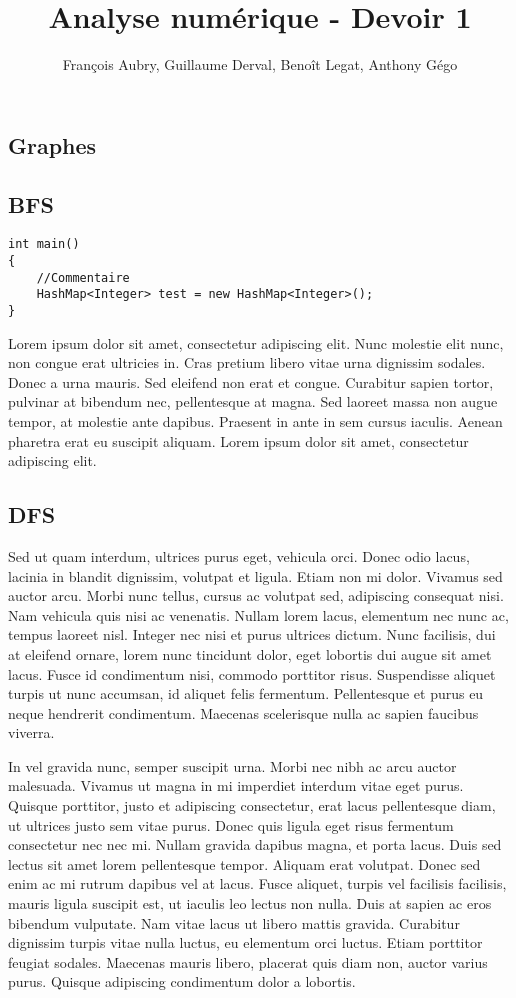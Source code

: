 \documentclass[2pt,a4paper,twoside ]{article}
\author{François Aubry, Guillaume Derval, Benoît Legat, Anthony Gégo}
\title{Analyse numérique - Devoir 1}
\begin{document}
\begin{multicols}{2}
\tableofcontents
\section{Graphes}
\subsection{BFS}
\begin{lstlisting}
int main()
{
	//Commentaire
	HashMap<Integer> test = new HashMap<Integer>();
}
\end{lstlisting}
Lorem ipsum dolor sit amet, consectetur adipiscing elit. Nunc molestie elit nunc, non congue erat ultricies in. Cras pretium libero vitae urna dignissim sodales. Donec a urna mauris. Sed eleifend non erat et congue. Curabitur sapien tortor, pulvinar at bibendum nec, pellentesque at magna. Sed laoreet massa non augue tempor, at molestie ante dapibus. Praesent in ante in sem cursus iaculis. Aenean pharetra erat eu suscipit aliquam. Lorem ipsum dolor sit amet, consectetur adipiscing elit.
\subsection{DFS}
Sed ut quam interdum, ultrices purus eget, vehicula orci. Donec odio lacus, lacinia in blandit dignissim, volutpat et ligula. Etiam non mi dolor. Vivamus sed auctor arcu. Morbi nunc tellus, cursus ac volutpat sed, adipiscing consequat nisi. Nam vehicula quis nisi ac venenatis. Nullam lorem lacus, elementum nec nunc ac, tempus laoreet nisl. Integer nec nisi et purus ultrices dictum. Nunc facilisis, dui at eleifend ornare, lorem nunc tincidunt dolor, eget lobortis dui augue sit amet lacus. Fusce id condimentum nisi, commodo porttitor risus. Suspendisse aliquet turpis ut nunc accumsan, id aliquet felis fermentum. Pellentesque et purus eu neque hendrerit condimentum. Maecenas scelerisque nulla ac sapien faucibus viverra.

In vel gravida nunc, semper suscipit urna. Morbi nec nibh ac arcu auctor malesuada. Vivamus ut magna in mi imperdiet interdum vitae eget purus. Quisque porttitor, justo et adipiscing consectetur, erat lacus pellentesque diam, ut ultrices justo sem vitae purus. Donec quis ligula eget risus fermentum consectetur nec nec mi. Nullam gravida dapibus magna, et porta lacus. Duis sed lectus sit amet lorem pellentesque tempor. Aliquam erat volutpat. Donec sed enim ac mi rutrum dapibus vel at lacus. Fusce aliquet, turpis vel facilisis facilisis, mauris ligula suscipit est, ut iaculis leo lectus non nulla. Duis at sapien ac eros bibendum vulputate. Nam vitae lacus ut libero mattis gravida. Curabitur dignissim turpis vitae nulla luctus, eu elementum orci luctus. Etiam porttitor feugiat sodales. Maecenas mauris libero, placerat quis diam non, auctor varius purus. Quisque adipiscing condimentum dolor a lobortis.


\end{multicols}
\end{document}

